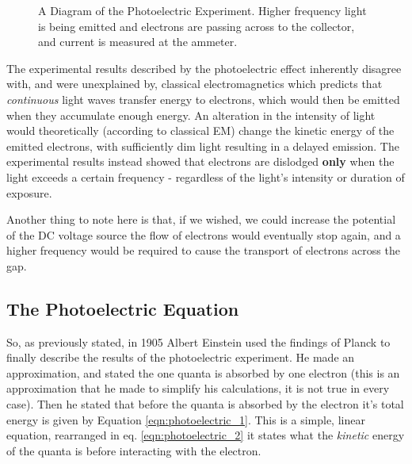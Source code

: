 \documentclass[../../Quantum-Technologies-Notes]{subfiles}
\begin{document}
			
			\pagebreak
			
			
			\begin{figure}[!h]
				\centering
				
				\caption{A Diagram of the Photoelectric Experiment. Higher frequency light is being emitted and electrons are passing across to the collector, and current is measured at the ammeter.}
				\label{fig:photoelectric_effect_experiment_high_freq}
			\end{figure}
			
			
			The experimental results described by the photoelectric effect inherently disagree with, and were unexplained by, classical electromagnetics which predicts that \textit{continuous} light waves transfer energy to electrons, which would then be emitted when they accumulate enough energy. An alteration in the intensity of light would theoretically (according to classical EM) change the kinetic energy of the emitted electrons, with sufficiently dim light resulting in a delayed emission. The experimental results instead showed that electrons are dislodged \textbf{only} when the light exceeds a certain frequency - regardless of the light's intensity or duration of exposure. \linebreak
			
			Another thing to note here is that, if we wished, we could increase the potential of the DC voltage source the flow of electrons would eventually stop again, and a higher frequency would be required to cause the transport of electrons across the gap. \linebreak
		
		
		\pagebreak
		
		\subsection{The Photoelectric Equation}
			So, as previously stated, in 1905 Albert Einstein used the findings of Planck to finally describe the results of the photoelectric experiment. He made an approximation, and stated the one quanta is absorbed by one electron (this is an approximation that he made to simplify his calculations, it is not true in every case). Then he stated that before the quanta is absorbed by the electron it's total energy is given by Equation \ref{eqn:photoelectric_1}. This is a simple, linear equation, rearranged in eq. \ref{eqn:photoelectric_2} it states what the \textit{kinetic} energy of the quanta is before interacting with the electron. 
		
\end{document}
